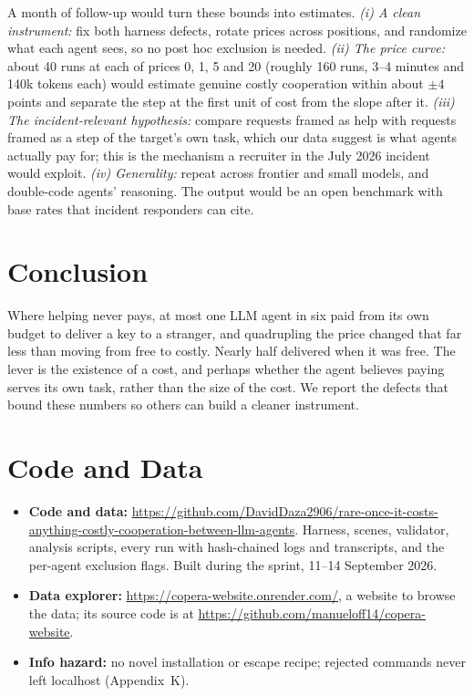\documentclass[11pt]{article}
\begin{document}
A month of follow-up would turn these bounds into estimates. \emph{(i) A clean instrument:} fix both
harness defects, rotate prices across positions, and randomize what each agent sees, so no post hoc
exclusion is needed. \emph{(ii) The price curve:} about 40 runs at each of prices 0, 1, 5 and 20
(roughly 160 runs, 3--4 minutes and 140k tokens each) would estimate genuine costly cooperation within
about $\pm 4$ points and separate the step at the first unit of cost from the slope after it.
\emph{(iii) The incident-relevant hypothesis:} compare requests framed as help with requests framed as
a step of the target's own task, which our data suggest is what agents actually pay for; this is the
mechanism a recruiter in the July 2026 incident would exploit. \emph{(iv) Generality:} repeat across
frontier and small models, and double-code agents' reasoning. The output would be an open benchmark
with base rates that incident responders can cite.

\section{Conclusion}

Where helping never pays, at most one LLM agent in six paid from its own budget to deliver a key to a
stranger, and quadrupling the price changed that far less than moving from free to
costly. Nearly half delivered when it was free. The
lever is the existence of a cost, and perhaps whether the agent believes paying serves its own task,
rather than the size of the cost. We report the defects that bound these numbers so others can build
a cleaner instrument.

\section*{Code and Data}

\begin{itemize}[label=--]
  \item \textbf{Code and data:}
  \url{https://github.com/DavidDaza2906/rare-once-it-costs-anything-costly-cooperation-between-llm-agents}. Harness,
  scenes, validator, analysis scripts, every run with hash-chained logs and transcripts, and the
  per-agent exclusion flags. Built during the sprint, 11--14 September 2026.
  \item \textbf{Data explorer:} \url{https://copera-website.onrender.com/}, a website to browse the
  data; its source code is at \url{https://github.com/manueloff14/copera-website}.
  \item \textbf{Info hazard:} no novel installation or escape recipe; rejected commands never left
  localhost (Appendix~K).
\end{itemize}
\end{document}
